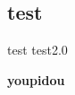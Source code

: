 \documentclass[10pt, a4paper]{article}
\begin{document}


{}
\setcounter{page}{1}

\section{}
\subsection{test}
test
test2.0


\textbf{youpidou}


\printbibliography
\end{document}
